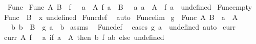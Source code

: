 \begin{isabellebody}
\ Func\ \isanewline
{\isachardoublequoteopen}Func\ A\ B\ {\isacharequal}{\kern0pt}\ {\isacharbraceleft}{\kern0pt}f\ {\isachardot}{\kern0pt}\ {\isacharparenleft}{\kern0pt}{\isasymforall}\ a\ {\isasymin}\ A{\isachardot}{\kern0pt}\ f\ a\ {\isasymin}\ B{\isacharparenright}{\kern0pt}\ {\isasymand}\ {\isacharparenleft}{\kern0pt}{\isasymforall}\ a{\isachardot}{\kern0pt}\ a\ {\isasymnotin}\ A\ {\isasymlongrightarrow}\ f\ a\ {\isacharequal}{\kern0pt}\ undefined{\isacharparenright}{\kern0pt}{\isacharbraceright}{\kern0pt}{\isachardoublequoteclose}\isanewline
\isanewline
{}\isamarkupfalse%
\ Func{\isacharunderscore}{\kern0pt}empty{\isacharcolon}{\kern0pt}\isanewline
{\isachardoublequoteopen}Func\ {\isacharbraceleft}{\kern0pt}{\isacharbraceright}{\kern0pt}\ B\ {\isacharequal}{\kern0pt}\ {\isacharbraceleft}{\kern0pt}{\isasymlambda}x{\isachardot}{\kern0pt}\ undefined{\isacharbraceright}{\kern0pt}{\isachardoublequoteclose}\isanewline
%
\isadelimproof
%
\endisadelimproof
%
\isatagproof
{}\isamarkupfalse%
\ Func{\isacharunderscore}{\kern0pt}def\ \isamarkupfalse%
\ auto%
\endisatagproof
{\isafoldproof}%
%
\isadelimproof
\isanewline
%
\endisadelimproof
\isanewline
{}\isamarkupfalse%
\ Func{\isacharunderscore}{\kern0pt}elim{\isacharcolon}{\kern0pt}\isanewline
{}\ {\isachardoublequoteopen}g\ {\isasymin}\ Func\ A\ B{\isachardoublequoteclose}\ \ {\isachardoublequoteopen}a\ {\isasymin}\ A{\isachardoublequoteclose}\isanewline
{}\ {\isachardoublequoteopen}{\isasymexists}\ b{\isachardot}{\kern0pt}\ b\ {\isasymin}\ B\ {\isasymand}\ g\ a\ {\isacharequal}{\kern0pt}\ b{\isachardoublequoteclose}\isanewline
%
\isadelimproof
%
\endisadelimproof
%
\isatagproof
{}\isamarkupfalse%
\ assms\ \isamarkupfalse%
\ Func{\isacharunderscore}{\kern0pt}def\ \isamarkupfalse%
\ {\isacharparenleft}{\kern0pt}cases\ {\isachardoublequoteopen}g\ a\ {\isacharequal}{\kern0pt}\ undefined{\isachardoublequoteclose}{\isacharparenright}{\kern0pt}\ auto%
\endisatagproof
{\isafoldproof}%
%
\isadelimproof
\isanewline
%
\endisadelimproof
\isanewline
{}\isamarkupfalse%
\ curr\ \isanewline
{\isachardoublequoteopen}curr\ A\ f\ {\isasymequiv}\ {\isasymlambda}\ a{\isachardot}{\kern0pt}\ if\ a\ {\isasymin}\ A\ then\ {\isasymlambda}b{\isachardot}{\kern0pt}\ f\ {\isacharparenleft}{\kern0pt}a{\isacharcomma}{\kern0pt}b{\isacharparenright}{\kern0pt}\ else\ undefined{\isachardoublequoteclose}\isanewline
\isanewline

\end{isabellebody}
